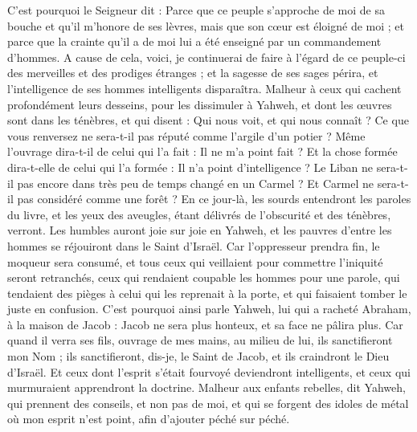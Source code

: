 \begin{multicols}{2}
C'est pourquoi le Seigneur dit : Parce que ce peuple s'approche de moi de sa bouche et qu'il m'honore de ses lèvres, mais que son cœur est éloigné de moi ; et parce que la crainte qu'il a de moi lui a été enseigné par un commandement d'hommes.
A cause de cela, voici, je continuerai de faire à l'égard de ce peuple-ci des merveilles et des prodiges étranges ; et la sagesse de ses sages périra, et l'intelligence de ses hommes intelligents disparaîtra.
Malheur à ceux qui cachent profondément leurs desseins, pour les dissimuler à Yahweh, et dont les œuvres sont dans les ténèbres, et qui disent : Qui nous voit, et qui nous connaît ?
Ce que vous renversez ne sera-t-il pas réputé comme l'argile d'un potier ? Même l'ouvrage dira-t-il de celui qui l'a fait : Il ne m'a point fait ? Et la chose formée dira-t-elle de celui qui l'a formée : Il n'a point d'intelligence ?
Le Liban ne sera-t-il pas encore dans très peu de temps changé en un Carmel ? Et Carmel ne sera-t-il pas considéré comme une forêt ?
En ce jour-là, les sourds entendront les paroles du livre, et les yeux des aveugles, étant délivrés de l'obscurité et des ténèbres, verront.
Les humbles auront joie sur joie en Yahweh, et les pauvres d'entre les hommes se réjouiront dans le Saint d'Israël.
Car l'oppresseur prendra fin, le moqueur sera consumé, et tous ceux qui veillaient pour commettre l'iniquité seront retranchés,
ceux qui rendaient coupable les hommes pour une parole, qui tendaient des pièges à celui qui les reprenait à la porte, et qui faisaient tomber le juste en confusion. 
C'est pourquoi ainsi parle Yahweh, lui qui a racheté Abraham, à la maison de Jacob : Jacob ne sera plus honteux, et sa face ne pâlira plus.
Car quand il verra ses fils, ouvrage de mes mains, au milieu de lui, ils sanctifieront mon Nom ; ils sanctifieront, dis-je, le Saint de Jacob, et ils craindront le Dieu d'Israël.
Et ceux dont l'esprit s'était fourvoyé deviendront intelligents, et ceux qui murmuraient apprendront la doctrine.
\VerseOne{}Malheur aux enfants rebelles, dit Yahweh, qui prennent des conseils, et non pas de moi, et qui se forgent des idoles de métal où mon esprit n'est point, afin d'ajouter péché sur péché.

\end{multicols}
